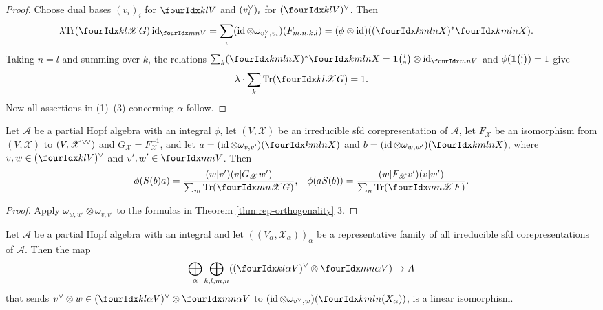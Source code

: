 \begin{proof}
  Choose dual  bases
  $(v_{i})_{i}$ for $\Gru{V}{k}{l}$ and $(v^{\vee}_{i})_{i}$ for  $\dual{(\Gru{V}{k}{l})}$. Then
  \begin{align*}
    \lambda   \Tr( \Gr{G}{k}{l}{}{\mathscr{X}}) \id_{\Gru{V}{m}{n}}
 &= \sum_{i} (\id \otimes
    \omega_{\dual{v}_{i},v_{i}})(F_{m,n,k,l}) = (\phi \otimes
    \id)((\Gr{X}{k}{l}{m}{n})^{*} \Gr{X}{k}{l}{m}{n}).
  \end{align*}
  Taking $n=l$ and summing over $k$, the relations $\sum_{k}
  (\Gr{X}{k}{l}{m}{n})^{*} \Gr{X}{k}{l}{m}{n} = \UnitC{l}{n}
  \otimes \id_{\Gru{V}{m}{n}}$ and
  $\phi(\mathbf{1}{\tiny {\begin{pmatrix} l\\l\end{pmatrix}}})=1$ give
\begin{align*}
\lambda \cdot  \sum_{k} \Tr(\Gr{G}{k}{l}{}{\mathscr{X}}) = 1.
\end{align*}
Now all assertions in (1)--(3) concerning $\alpha$ follow.
\end{proof}
\begin{Cor}\label{CorOrth}
  Let $\mathscr{A}$ be a partial Hopf algebra with an integral $\phi$, let
  $(V,\mathscr{X})$ be an irreducible sfd corepresentation of
  $\mathscr{A}$, let $F_{\mathscr{X}}$ be an isomorphism from
  $(V,\mathscr{X})$ to $(V,\mathscr{X}^{\vee}{}\!^{\vee})$ and
  $G_{\mathscr{X}}=F^{-1}_{{\mathscr{X}}}$, and let $a=(\id \otimes
  \omega_{v,v'})(\Gr{X}{k}{l}{m}{n})$ and $b=(\id \otimes
  \omega_{w,w'})(\Gr{X}{k}{l}{m}{n})$, where $v,w \in
  \dual{(\Gru{V}{k}{l})}$ and $v',w' \in \Gru{V}{m}{n}$.  Then
\begin{align*}
  \phi(S(b)a) &= \frac{(w|v')(v|G_{\mathscr{X}}w')}{\sum_{m}
    \Tr(\Gr{G}{m}{n}{}{\mathscr{X}})}, & \phi(aS(b)) = \frac{(w|F_{\mathscr{X}}v')(v|w')}{\sum_{n}
    \Tr(\Gr{F}{m}{n}{}{\mathscr{X}})}.
\end{align*}
\end{Cor}
\begin{proof}
Apply $\omega_{w,w'} \otimes
    \omega_{v,v'}$ to the formulas in  Theorem
    \ref{thm:rep-orthogonality} 3.
\end{proof}
\begin{Cor} \label{cor:rep-pw}
  Let $\mathscr{A}$ be a partial Hopf algebra with an integral and let
  $((V_{\alpha},\mathscr{X}_{\alpha}))_{\alpha}$ be a representative
  family of all irreducible sfd corepresentations of
  $\mathscr{A}$. Then the map
  \begin{align*}
    \bigoplus_{\alpha} \bigoplus_{k,l,m,n}
    (\dual{(\Gr{V}{k}{l}{}{\alpha})} \otimes
    \Gr{V}{m}{n}{}{\alpha}) \to A
  \end{align*}
  that sends $\dual{v} \otimes w \in
  \dual{(\Gr{V}{k}{l}{}{\alpha})} \otimes
  \Gr{V}{m}{n}{}{\alpha}$ to $ (\id \otimes
  \omega_{\dual{v},w})(\Gr{(X_{\alpha})}{k}{l}{m}{n})$,
  is a linear isomorphism. 
\end{Cor}
